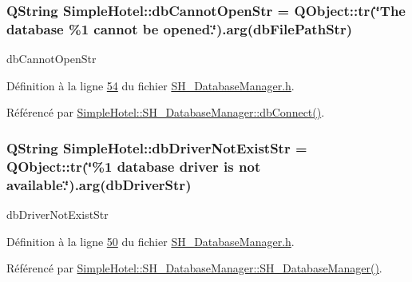\hypertarget{namespaceSimpleHotel_a432df3653afae1e72d3e6ce1cbbb7a63}{
\subsubsection[{db\-Cannot\-Open\-Str}]{\setlength{\rightskip}{0pt plus 5cm}Q\-String Simple\-Hotel\-::db\-Cannot\-Open\-Str = Q\-Object\-::tr(\char`\"{}The database \%1 cannot be opened.\char`\"{}).arg({\bf db\-File\-Path\-Str})\hspace{0.3cm}{\ttfamily [static]}}}\label{namespaceSimpleHotel_a432df3653afae1e72d3e6ce1cbbb7a63}


db\-Cannot\-Open\-Str 



Définition à la ligne \hyperlink{SH__DatabaseManager_8h_source_l00054}{54} du fichier \hyperlink{SH__DatabaseManager_8h_source}{S\-H\-\_\-\-Database\-Manager.\-h}.



Référencé par \hyperlink{classSimpleHotel_1_1SH__DatabaseManager_a5706c91e422a3345bfd832f14132846c}{Simple\-Hotel\-::\-S\-H\-\_\-\-Database\-Manager\-::db\-Connect()}.

\hypertarget{namespaceSimpleHotel_a69c8ef43acac781f735932ee6026c913}{
\subsubsection[{db\-Driver\-Not\-Exist\-Str}]{\setlength{\rightskip}{0pt plus 5cm}Q\-String Simple\-Hotel\-::db\-Driver\-Not\-Exist\-Str = Q\-Object\-::tr(\char`\"{}\%1 database driver is not available.\char`\"{}).arg({\bf db\-Driver\-Str})\hspace{0.3cm}{\ttfamily [static]}}}\label{namespaceSimpleHotel_a69c8ef43acac781f735932ee6026c913}


db\-Driver\-Not\-Exist\-Str 



Définition à la ligne \hyperlink{SH__DatabaseManager_8h_source_l00050}{50} du fichier \hyperlink{SH__DatabaseManager_8h_source}{S\-H\-\_\-\-Database\-Manager.\-h}.



Référencé par \hyperlink{classSimpleHotel_1_1SH__DatabaseManager_ade00a085fdf7207d67476179e179d03d}{Simple\-Hotel\-::\-S\-H\-\_\-\-Database\-Manager\-::\-S\-H\-\_\-\-Database\-Manager()}.

